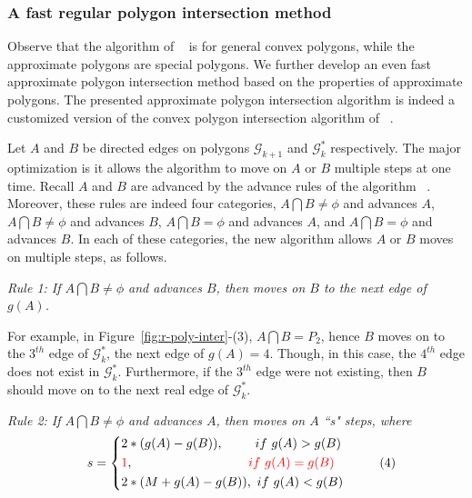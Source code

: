 
\subsubsection{A fast regular polygon intersection method}


Observe that the algorithm of ~\cite{ORourke:Intersection} is for general convex polygons, while the approximate polygons are special polygons. We further develop an even fast approximate polygon intersection method based on the properties of approximate polygons.
%
The presented approximate polygon intersection algorithm is indeed a customized version of the convex polygon intersection algorithm of ~\cite{ORourke:Intersection}. 

Let $A$ and $B$ be directed edges on polygons $\mathcal{G}_{k+1}$ and $\mathcal{G}^*_k$ respectively. The major optimization is it allows the algorithm to move on $A$ or $B$ multiple steps at one time.
Recall $A$ and $B$ are advanced by the advance rules of the algorithm ~\cite{ORourke:Intersection}.
Moreover, these rules are indeed four categories, \ie $A \bigcap B \ne \phi$ and advances $A$, $A \bigcap B \ne \phi$ and advances $B$, $A \bigcap B = \phi$ and advances $A$, and $A \bigcap B = \phi$ and advances $B$.
%
In each of these categories, the new algorithm allows $A$ or $B$ moves on multiple steps, as follows.



\sstab \emph{Rule 1: 
If $A \bigcap B \ne \phi$ and advances $B$, then moves on $B$ to the next edge of $g(A)$.}


For example, in Figure~\ref{fig:r-poly-inter}-(3), $A \bigcap B = P_2$, hence $B$ moves on to the $3^{th}$ edge of $\mathcal{G}^*_k$, the next edge of $g(A) = 4$. Though, in this case, the $4^{th}$ edge does not exist in $\mathcal{G}^*_k$. Furthermore, if the $3^{th}$ edge were not existing, then $B$ should move on to the next real edge of $\mathcal{G}^*_k$.


\sstab \emph{Rule 2: 
If $A \bigcap B \ne \phi$ and advances $A$, then moves on $A$ ``s" steps, where}
\vspace{-1ex}
\begin{equation*}
\small
\label{equ-rule1}
    \hspace{2ex} s =  \left\{
    \begin{aligned}
        & 2*(g(A) - g(B)),  \hspace{5ex} ~if  ~g(A) > g(B) \\
        & \textcolor[rgb]{1.00,0.00,0.00}{1}, \hspace{21ex}\textcolor[rgb]{1.00,0.00,0.00}{if  ~g(A) = g(B)} \\
        & 2*(M+g(A) - g(B)), ~if  ~g(A) < g(B) \\
    \end{aligned}
    \right.       \hspace{6ex}(4)
\end{equation*}
\vspace{-1ex}



